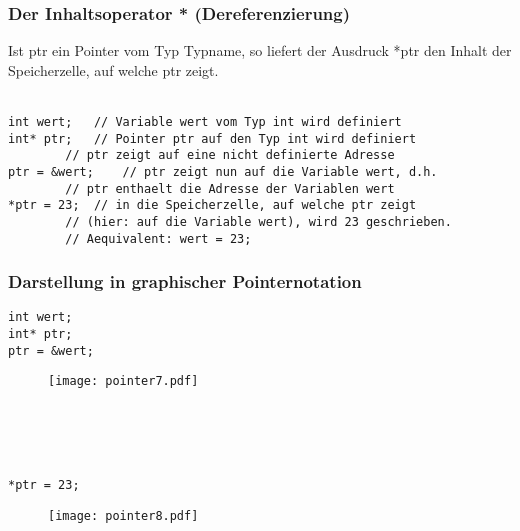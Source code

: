 \subsubsection{Der Inhaltsoperator * \textbf{(Dereferenzierung)}\hfill}
\label{sec:Der Inhaltsoperator}
Ist ptr ein Pointer vom Typ Typname, so liefert der Ausdruck *ptr den Inhalt der Speicherzelle, auf welche ptr zeigt.\\
\\
\noindent
\begin{minipage}{\linewidth}
\begin{lstlisting}
int wert;	// Variable wert vom Typ int wird definiert
int* ptr;	// Pointer ptr auf den Typ int wird definiert
		// ptr zeigt auf eine nicht definierte Adresse
ptr = &wert;	// ptr zeigt nun auf die Variable wert, d.h.
		// ptr enthaelt die Adresse der Variablen wert
*ptr = 23;	// in die Speicherzelle, auf welche ptr zeigt
		// (hier: auf die Variable wert), wird 23 geschrieben.
		// Aequivalent: wert = 23;
\end{lstlisting}
\end{minipage}

\subsubsection{Darstellung in graphischer Pointernotation\hfill}
\label{sec:Darstellung in graphischer Pointernotation}
\noindent
\begin{minipage}{\linewidth}
\begin{lstlisting}
int wert;
int* ptr;
ptr = &wert;
\end{lstlisting}
\end{minipage}
\begin{figure}[h]
	\centering
	\texttt{[image: pointer7.pdf]}
\end{figure}
\\ \\ \\
\noindent
\begin{minipage}{\linewidth}
\begin{lstlisting}
*ptr = 23;
\end{lstlisting}
\end{minipage}
\begin{figure}[h]
	\centering
	\texttt{[image: pointer8.pdf]}
\end{figure}
\\ \\ \\

